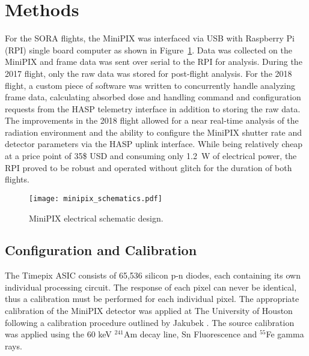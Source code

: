 \section{Methods}
\label{Methods}
For the SORA flights, the MiniPIX was interfaced via USB with Raspberry Pi (RPI) single board computer as shown in Figure~\ref{fig:minipix_sch}. Data was collected on the MiniPIX and frame data was sent over serial to the RPI for analysis. During the 2017 flight, only the raw data was stored for post-flight analysis. For the 2018 flight, a custom piece of software was written to concurrently handle analyzing frame data, calculating absorbed dose and handling command and configuration requests from the HASP telemetry interface in addition to storing the raw data. The improvements in the 2018 flight allowed for a near real-time analysis of the radiation environment and the ability to configure the MiniPIX shutter rate and detector parameters via the HASP uplink interface. While being relatively cheap at a price point of 35\$ USD and consuming only \SI{1.2}{\watt} of electrical power, the RPI proved to be robust and operated without glitch for the duration of both flights.

\begin{figure}[H]
    \centering
    \texttt{[image: minipix\_schematics.pdf]}
    \caption{MiniPIX electrical schematic design.}
    \label{fig:minipix_sch}
\end{figure}


\subsection{Configuration and Calibration}
The Timepix ASIC consists of 65,536 silicon p-n diodes, each containing its own individual processing circuit. The response of each pixel can never be identical, thus a calibration must be performed for each individual pixel. The appropriate calibration of the MiniPIX detector was applied at The University of Houston following a calibration procedure outlined by Jakubek \cite{mpjakubek}. The source calibration was applied using the 60 keV $^{241}$Am decay line, Sn Fluorescence and $^{55}$Fe gamma rays.

